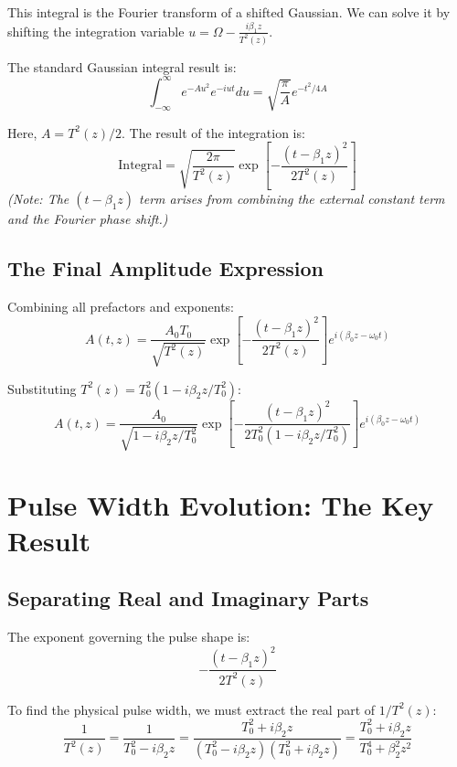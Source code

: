 \documentclass[12pt]{article}
\begin{document}
This integral is the Fourier transform of a shifted Gaussian. We can solve it by shifting the integration variable $u = \Omega - \frac{i\beta_1 z}{T^2(z)}$.

The standard Gaussian integral result is:
\begin{equation}
\int_{-\infty}^\infty e^{-Au^2} e^{-iut} du = \sqrt{\frac{\pi}{A}} e^{-t^2/4A}
\end{equation}

Here, $A = T^2(z)/2$. The result of the integration is:
\begin{equation}
\text{Integral} = \sqrt{\frac{2\pi}{T^2(z)}} \exp\left[-\frac{(t - \beta_1 z)^2}{2T^2(z)}\right]
\end{equation}
\textit{(Note: The $(t-\beta_1 z)$ term arises from combining the external constant term and the Fourier phase shift.)}

\subsection{The Final Amplitude Expression}

Combining all prefactors and exponents:
\begin{equation}
\boxed{A(t, z) = \frac{A_0 T_0}{\sqrt{T^2(z)}} \exp\left[-\frac{(t - \beta_1 z)^2}{2T^2(z)}\right] e^{i(\beta_0 z - \omega_0 t)}}
\end{equation}

Substituting $T^2(z) = T_0^2(1 - i\beta_2 z/T_0^2)$:
\begin{equation}
A(t, z) = \frac{A_0}{\sqrt{1 - i\beta_2 z/T_0^2}} \exp\left[-\frac{(t - \beta_1 z)^2}{2T_0^2(1 - i\beta_2 z/T_0^2)}\right] e^{i(\beta_0 z - \omega_0 t)}
\end{equation}

\section{Pulse Width Evolution: The Key Result}

\subsection{Separating Real and Imaginary Parts}

The exponent governing the pulse shape is:
\begin{equation}
-\frac{(t - \beta_1 z)^2}{2T^2(z)}
\end{equation}

To find the physical pulse width, we must extract the real part of $1/T^2(z)$:
\begin{equation}
\frac{1}{T^2(z)} = \frac{1}{T_0^2 - i\beta_2 z} = \frac{T_0^2 + i\beta_2 z}{(T_0^2 - i\beta_2 z)(T_0^2 + i\beta_2 z)} = \frac{T_0^2 + i\beta_2 z}{T_0^4 + \beta_2^2 z^2}
\end{equation}
\end{document}
